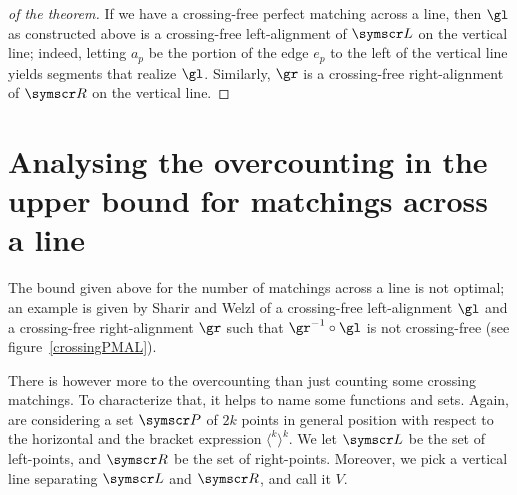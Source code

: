 \documentclass[10pt, a4paper, twoside]{basestyle}
\newcommand{\pointset}{\symscr}
\begin{document}
\begin{proof}[of the theorem]
If we have a crossing-free perfect matching across a line, then $\gl$ as constructed above is a crossing-free
left-alignment of $\pointset L$ on the vertical line; indeed, letting $a_p$ be the portion of the edge $e_p$
to the left of the vertical line yields segments that realize $\gl$.
Similarly, $\gr$ is a crossing-free right-alignment of $\pointset R$ on the vertical line.
\end{proof}
\section{Analysing the overcounting in the upper bound for matchings across a line}
\label{sectionOvercounting}
The bound given above for the number of matchings across a line is not optimal;
an example is given by Sharir and Welzl of a crossing-free left-alignment $\gl$ and a crossing-free
right-alignment $\gr$ such that $\gr^{-1}\Compose \gl$ is not crossing-free (see figure~\ref{crossingPMAL}).

There is however more to the overcounting than just counting some crossing matchings.
To characterize that, it helps to name some functions and sets. Again, are considering a
set $\pointset P$ of $2k$ points in general position with respect to the horizontal and the bracket
expression $\langle^k\rangle^k$.  We let $\pointset L$ be the set of left-points, and $\pointset R$ be the
set of right-points. Moreover, we pick a vertical line separating $\pointset L$ and $\pointset R$, and call it
$V$.
\end{document}
